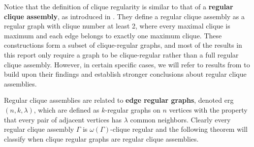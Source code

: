 \documentclass[12pt]{report}
\theoremstyle{definition}
\begin{document}
Notice that the definition of clique regularity is similar to that of a \textbf{regular clique assembly}, as introduced in \cite{guest}. They define a regular clique assembly as a regular graph with clique number at least 2, where every maximal clique is maximum and each edge belongs to exactly one maximum clique. These constructions form a subset of clique-regular graphs, and most of the results in this report only require a graph to be clique-regular rather than a full regular clique assembly. However, in certain specific cases, we will refer to results from \cite{guest} to build upon their findings and establish stronger conclusions about regular clique assemblies. \par
Regular clique assemblies are related to \textbf{edge regular graphs}, denoted erg$(n,k,\lambda)$, which are defined as $k$-regular graphs on $n$ vertices with the property that every pair of adjacent vertices has $\lambda$ common neighbors. Clearly every regular clique assembly $\Gamma$ is $\omega(\Gamma)$-clique regular and the following theorem will classify when clique regular graphs are regular clique assemblies. 
\end{document}
